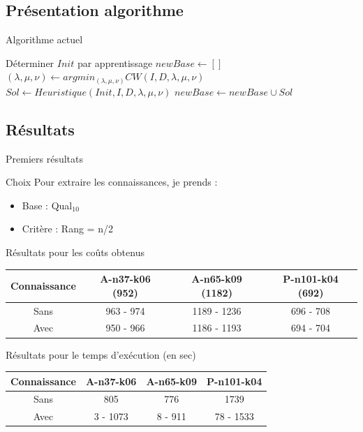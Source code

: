 \documentclass{beamer}
\begin{document}
\subsection{Présentation algorithme}
\begin{frame}{Algorithme actuel}

\begin{algorithm}[H]
\DontPrintSemicolon %
Déterminer $Init$ par apprentissage\;
$newBase \gets []$\;
 {
	$(\lambda,\mu,\nu) \gets argmin_{(\lambda,\mu,\nu)}CW(I,D,\lambda,\mu,\nu)$\;
	 {
		$Sol \gets Heuristique(Init,I,D,\lambda,\mu,\nu)$\;
		$newBase \gets newBase \cup Sol$\;
	}
}
\;

\end{algorithm}

\end{frame}

\subsection{Résultats}

\begin{frame}{Premiers résultats}
\begin{block}{Choix}
Pour extraire les connaissances, je prends :
\begin{itemize}
\item Base : Qual$_{10}$
\item Critère : Rang = n/2
\end{itemize}
\end{block}

Résultats pour les coûts obtenus
\begin{tabular}{|c|c|c|c|}
   \hline
   Connaissance & A-n37-k06 (952) & A-n65-k09 (1182) & P-n101-k04 (692)  \\
   \hline
   Sans & 963 - 974  & 1189 - 1236 & 696 - 708   \\
   \hline
   Avec & 950 - 966 & 1186 - 1193 & 694 - 704  \\
   \hline
\end{tabular}

Résultats pour le temps d'exécution (en sec)
\begin{tabular}{|c|c|c|c|}
   \hline
   Connaissance  & A-n37-k06 & A-n65-k09 & P-n101-k04  \\
   \hline
   Sans & 805  & 776 &  1739  \\
   \hline
   Avec & 3 - 1073 & 8 - 911 & 78 - 1533  \\
   \hline
\end{tabular}

\end{frame}
\end{document}
